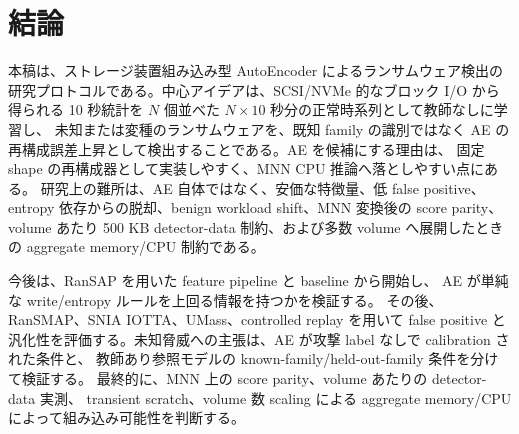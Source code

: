 \section{結論}

本稿は、ストレージ装置組み込み型 AutoEncoder によるランサムウェア検出の
研究プロトコルである。中心アイデアは、SCSI/NVMe 的なブロック I/O から得られる
10 秒統計を $N$ 個並べた $N \times 10$ 秒分の正常時系列として教師なしに学習し、
未知または変種のランサムウェアを、既知 family の識別ではなく AE の
再構成誤差上昇として検出することである。AE を候補にする理由は、
固定 shape の再構成器として実装しやすく、MNN CPU 推論へ落としやすい点にある。
研究上の難所は、AE 自体ではなく、安価な特徴量、低 false positive、
entropy 依存からの脱却、benign workload shift、MNN 変換後の score parity、
volume あたり 500 KB detector-data 制約、および多数 volume へ展開したときの
aggregate memory/CPU 制約である。

今後は、RanSAP を用いた feature pipeline と baseline から開始し、
AE が単純な write/entropy ルールを上回る情報を持つかを検証する。
その後、RanSMAP、SNIA IOTTA、UMass、controlled replay を用いて false positive と
汎化性を評価する。未知脅威への主張は、AE が攻撃 label なしで calibration された条件と、
教師あり参照モデルの known-family/held-out-family 条件を分けて検証する。
最終的に、MNN 上の score parity、volume あたりの detector-data 実測、
transient scratch、volume 数 scaling による
aggregate memory/CPU によって組み込み可能性を判断する。
